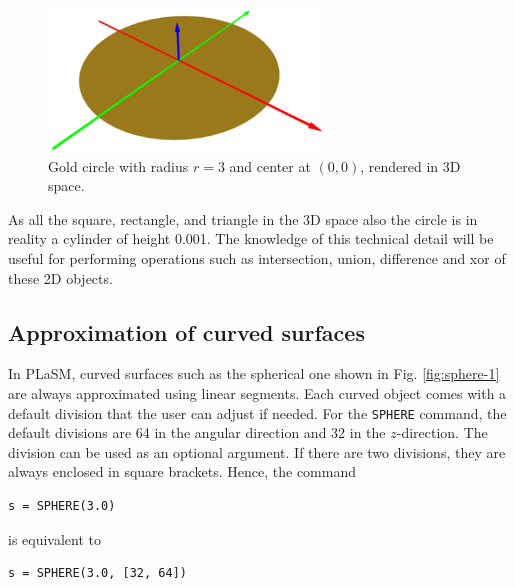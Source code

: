 \begin{figure}[!ht]
\begin{center}
\includegraphics[width=0.65\textwidth]{img/circle-2.png}
\end{center}
\vspace{-4mm}
\caption{Gold circle with radius $r = 3$ and center at $(0, 0)$, rendered in 3D space.}
\label{fig:circle-2}
\end{figure}
\noindent
As all the square, rectangle, and triangle in the 3D space also the circle is 
in reality a cylinder of height 0.001. The knowledge of this technical detail 
will be useful for performing operations such as intersection, union, difference
and xor of these 2D objects.

\subsection{Approximation of curved surfaces} \label{subsec:curved}

In PLaSM, curved surfaces such as the spherical one shown in Fig. \ref{fig:sphere-1}
are always approximated using linear segments. Each curved object comes
with a default division that the user can adjust if needed. For the 
{\tt SPHERE} command, the default divisions are 64 in the angular direction 
and 32 in the $z$-direction. The division can be used as an optional argument.
If there are two divisions, they are always enclosed in square brackets. Hence, 
the command\\

\begin{bbox}
\begin{verbatim}
s = SPHERE(3.0)
\end{verbatim}
\end{bbox}
\vspace{6mm}

\noindent
is equivalent to \\

\begin{bbox}
\begin{verbatim}
s = SPHERE(3.0, [32, 64])
\end{verbatim}
\end{bbox}
\vspace{6mm}

